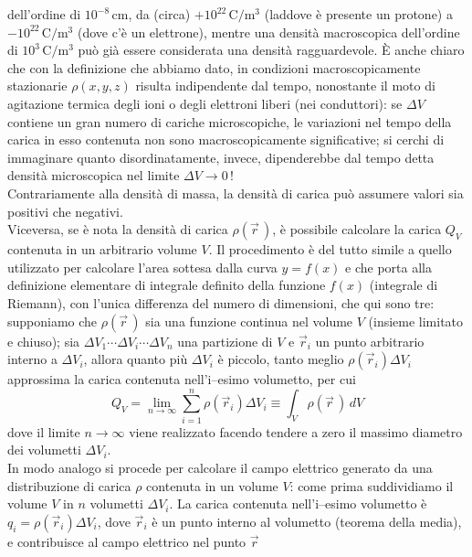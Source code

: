 dell'ordine di $10^{-8}\,\mathrm{cm}$, da (circa) $+10^{22}\,\mathrm{C/m^3}$
(laddove \`e presente un protone) a $-10^{22}\,\mathrm{C/m^3}$ (dove c'\`e un
elettrone), mentre una densit\`a macroscopica dell'ordine di
$10^3\,\mathrm{C/m^3}$ pu\`o gi\`a essere considerata una densit\`a
ragguardevole. \`E anche chiaro che con la definizione che abbiamo dato, in
condizioni macroscopicamente stazionarie $\rho(x,y,z)$ risulta indipendente dal
tempo, nonostante il moto di agitazione termica degli ioni o degli elettroni
liberi (nei conduttori): se $\Delta V$ contiene un gran numero di cariche
microscopiche, le variazioni nel tempo della carica in esso contenuta non sono
macroscopicamente significative; si cerchi di immaginare quanto
disordinatamente, invece, dipenderebbe dal tempo detta densit\`a microscopica
nel limite $\Delta V\to0\,$!\\
Contrariamente alla densit\`a di massa, la densit\`a di carica pu\`o assumere
valori sia positivi che negativi.\\
Viceversa, se \`e nota la densit\`a di carica $\rho(\vec r\,)$, \`e possibile
calcolare la carica $Q_V$ contenuta in un arbitrario volume $V$. Il procedimento
\`e del tutto simile a quello utilizzato per calcolare l'area sottesa dalla
curva $y=f(x)$ e che porta alla definizione elementare di integrale definito
della funzione $f(x)$ (integrale di Riemann), con l'unica differenza del numero
di dimensioni, che qui sono tre: supponiamo che $\rho(\vec r\,)$ sia una
funzione continua nel volume $V$ (insieme limitato e chiuso); sia
$\Delta V_1\cdots\Delta V_i\cdots\Delta V_n$ una partizione di $V$ e $\vec r_i$
un punto arbitrario interno a $\Delta V_i$, allora quanto pi\`u $\Delta V_i$ \`e
piccolo, tanto meglio $\rho(\vec r_i)\Delta V_i$ approssima la carica contenuta
nell'i--esimo volumetto, per cui
\begin{equation}
  Q_V=\lim_{n\to\infty}\sum_{i=1}^n\rho(\vec r_i)\Delta V_i
  \equiv\int_V\rho(\vec r\,)\,dV
  \tag{1.8}
\end{equation}
dove il limite $n\to\infty$ viene realizzato facendo tendere a zero il massimo
diametro dei volumetti $\Delta V_i$.\\
In modo analogo si procede per calcolare il campo elettrico generato da una
distribuzione di carica $\rho$ contenuta in un volume $V$: come prima
suddividiamo il volume $V$ in $n$ volumetti $\Delta V_i$. La carica contenuta
nell'i--esimo volumetto \`e $q_i=\rho(\vec r_i)\Delta V_i$, dove $\vec r_i$ \`e
un punto interno al volumetto (teorema della media), e contribuisce al campo
elettrico nel punto $\vec r$
